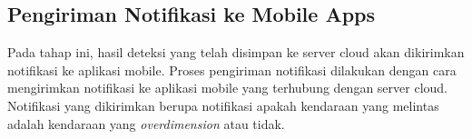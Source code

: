 \subsection{Pengiriman Notifikasi ke Mobile Apps}

Pada tahap ini, hasil deteksi yang telah disimpan ke server cloud akan dikirimkan notifikasi ke aplikasi mobile. Proses pengiriman notifikasi dilakukan dengan cara mengirimkan notifikasi ke aplikasi mobile yang terhubung dengan server cloud. Notifikasi yang dikirimkan berupa notifikasi apakah kendaraan yang melintas adalah kendaraan yang \emph{overdimension} atau tidak.